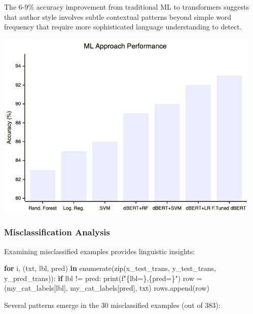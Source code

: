 \documentclass[
]{article}
\newenvironment{Shaded}{}{}
\newcommand{\BuiltInTok}[1]{\textcolor[rgb]{0.00,0.50,0.00}{#1}}
\newcommand{\ControlFlowTok}[1]{\textcolor[rgb]{0.00,0.44,0.13}{\textbf{#1}}}
\newcommand{\KeywordTok}[1]{\textcolor[rgb]{0.00,0.44,0.13}{\textbf{#1}}}
\newcommand{\NormalTok}[1]{#1}
\newcommand{\OperatorTok}[1]{\textcolor[rgb]{0.40,0.40,0.40}{#1}}
\newcommand{\SpecialCharTok}[1]{\textcolor[rgb]{0.25,0.44,0.63}{#1}}
\newcommand{\SpecialStringTok}[1]{\textcolor[rgb]{0.73,0.40,0.53}{#1}}
\begin{document}
The 6-9\% accuracy improvement from traditional ML to transformers
suggests that author style involves subtle contextual patterns beyond
simple word frequency that require more sophisticated language
understanding to detect.

\includegraphics[width=0.95\textwidth,height=\textheight]{image-20250611165131238.png}

\subsubsection{Misclassification
Analysis}\label{misclassification-analysis}

Examining misclassified examples provides linguistic insights:

\begin{Shaded}
\begin{Highlighting}[]
\ControlFlowTok{for}\NormalTok{ i, (txt, lbl, pred) }\KeywordTok{in} \BuiltInTok{enumerate}\NormalTok{(}\BuiltInTok{zip}\NormalTok{(x\_test\_trans, y\_test\_trans, y\_pred\_trans)):}
    \ControlFlowTok{if}\NormalTok{ lbl }\OperatorTok{!=}\NormalTok{ pred:}
        \BuiltInTok{print}\NormalTok{(}\SpecialStringTok{f"}\SpecialCharTok{\{}\NormalTok{lbl}\OperatorTok{=}\SpecialCharTok{\}}\SpecialStringTok{,}\SpecialCharTok{\{}\NormalTok{pred}\OperatorTok{=}\SpecialCharTok{\}}\SpecialStringTok{"}\NormalTok{)}
\NormalTok{        row }\OperatorTok{=}\NormalTok{(my\_cat\_labels[lbl], my\_cat\_labels[pred], txt)}
\NormalTok{        rows.append(row)}
\end{Highlighting}
\end{Shaded}

Several patterns emerge in the 30 misclassified examples (out of 383):
\end{document}
